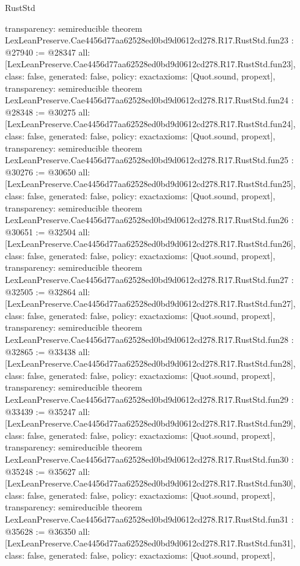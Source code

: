 \begin{lexlean}{RustStd}
\begin{coremodule}
{  transparency: semireducible
}
theorem LexLeanPreserve.Cae4456d77aa62528ed0bd9d0612cd278.R17.RustStd.fun23 : @27940 := @28347 {
  all: [LexLeanPreserve.Cae4456d77aa62528ed0bd9d0612cd278.R17.RustStd.fun23],
  class: false,
  generated: false,
  policy: exact{axioms: [Quot.sound, propext]},
  transparency: semireducible
}
theorem LexLeanPreserve.Cae4456d77aa62528ed0bd9d0612cd278.R17.RustStd.fun24 : @28348 := @30275 {
  all: [LexLeanPreserve.Cae4456d77aa62528ed0bd9d0612cd278.R17.RustStd.fun24],
  class: false,
  generated: false,
  policy: exact{axioms: [Quot.sound, propext]},
  transparency: semireducible
}
theorem LexLeanPreserve.Cae4456d77aa62528ed0bd9d0612cd278.R17.RustStd.fun25 : @30276 := @30650 {
  all: [LexLeanPreserve.Cae4456d77aa62528ed0bd9d0612cd278.R17.RustStd.fun25],
  class: false,
  generated: false,
  policy: exact{axioms: [Quot.sound, propext]},
  transparency: semireducible
}
theorem LexLeanPreserve.Cae4456d77aa62528ed0bd9d0612cd278.R17.RustStd.fun26 : @30651 := @32504 {
  all: [LexLeanPreserve.Cae4456d77aa62528ed0bd9d0612cd278.R17.RustStd.fun26],
  class: false,
  generated: false,
  policy: exact{axioms: [Quot.sound, propext]},
  transparency: semireducible
}
theorem LexLeanPreserve.Cae4456d77aa62528ed0bd9d0612cd278.R17.RustStd.fun27 : @32505 := @32864 {
  all: [LexLeanPreserve.Cae4456d77aa62528ed0bd9d0612cd278.R17.RustStd.fun27],
  class: false,
  generated: false,
  policy: exact{axioms: [Quot.sound, propext]},
  transparency: semireducible
}
theorem LexLeanPreserve.Cae4456d77aa62528ed0bd9d0612cd278.R17.RustStd.fun28 : @32865 := @33438 {
  all: [LexLeanPreserve.Cae4456d77aa62528ed0bd9d0612cd278.R17.RustStd.fun28],
  class: false,
  generated: false,
  policy: exact{axioms: [Quot.sound, propext]},
  transparency: semireducible
}
theorem LexLeanPreserve.Cae4456d77aa62528ed0bd9d0612cd278.R17.RustStd.fun29 : @33439 := @35247 {
  all: [LexLeanPreserve.Cae4456d77aa62528ed0bd9d0612cd278.R17.RustStd.fun29],
  class: false,
  generated: false,
  policy: exact{axioms: [Quot.sound, propext]},
  transparency: semireducible
}
theorem LexLeanPreserve.Cae4456d77aa62528ed0bd9d0612cd278.R17.RustStd.fun30 : @35248 := @35627 {
  all: [LexLeanPreserve.Cae4456d77aa62528ed0bd9d0612cd278.R17.RustStd.fun30],
  class: false,
  generated: false,
  policy: exact{axioms: [Quot.sound, propext]},
  transparency: semireducible
}
theorem LexLeanPreserve.Cae4456d77aa62528ed0bd9d0612cd278.R17.RustStd.fun31 : @35628 := @36350 {
  all: [LexLeanPreserve.Cae4456d77aa62528ed0bd9d0612cd278.R17.RustStd.fun31],
  class: false,
  generated: false,
  policy: exact{axioms: [Quot.sound, propext]},
}
\end{coremodule}
\end{lexlean}
